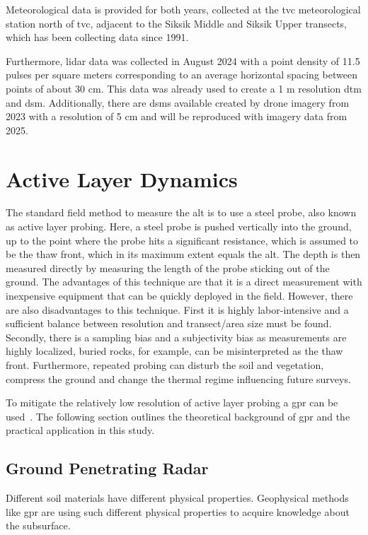 Meteorological data is provided for both years, collected at the \gls{tvc} meteorological station north of \gls{tvc}, adjacent to the Siksik Middle and Siksik Upper transects, which has been collecting data since 1991. 

Furthermore, lidar data was collected in August 2024 with a point density of 11.5 pulses per square meters corresponding to an average horizontal spacing between points of about 30 cm. 
This data was already used to create a 1 m resolution \gls{dtm} and \gls{dsm}. 
Additionally, there are \glspl{dsm} available created by drone imagery from 2023 with a resolution of 5 cm and will be reproduced with imagery data from 2025.

\section{Active Layer Dynamics}
The standard field method to measure the \gls{alt} is to use a steel probe, also known as active layer probing. 
Here, a steel probe is pushed vertically into the ground, up to the point where the probe hits a significant resistance, which is assumed to be the thaw front, which in its maximum extent equals the \gls{alt}.\@
The depth is then measured directly by measuring the length of the probe sticking out of the ground. 
The advantages of this technique are that it is a direct measurement with inexpensive equipment that can be quickly deployed in the field. 
However, there are also disadvantages to this technique. First it is highly labor-intensive and a sufficient balance between resolution and transect/area size must be found. 
Secondly, there is a sampling bias and a subjectivity bias as measurements are highly localized, buried rocks, for example, can be misinterpreted as the thaw front. 
Furthermore, repeated probing can disturb the soil and vegetation, compress the ground and change the thermal regime influencing future surveys.

To mitigate the relatively low resolution of active layer probing a \gls{gpr} can be used~\citep{angelopoulosApplicationCCRGPR2013,guoDetectionPermafrostSubgrade2015,harrisUsingGroundPenetratingRadar2025,hinkelDetectionSubsurfacePermafrost2001,koyanPotential3DGPR2025,moormanImagingNearsurfacePermafrost2007,sudakovaUsingGroundPenetrating2021,sudakovaGroundPenetratingRadarStudies2019}.
The following section outlines the theoretical background of \gls{gpr} and the practical application in this study.
\subsection{Ground Penetrating Radar}
Different soil materials have different physical properties. 
Geophysical methods like \gls{gpr} are using such different physical properties to acquire knowledge about the subsurface.

